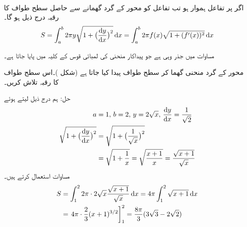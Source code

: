 \\
اگر  پر تفاعل  ہموار ہو تب تفاعل  کو  محور کے گرد گھمانے سے حاصل سطح طواف کا رقبہ درج ذیل ہو گا۔
\begin{align}\label{مساوات_تکمل_استعمال_سطحی_رقبہ_پ}                                
S=\int_a^b2\pi y\sqrt{1+\big(\frac{\dif y}{\dif x}\big)^2}\dif x=\int_a^b2\pi f(x)\sqrt{1+(f'(x))^2}\dif x
\end{align}

مساوات  میں جذر وہی ہے جو پیداکار منحنی کی لمبائی قوس کے کلیہ میں پایا جاتا ہے۔

محور  کے گرد منحنی  گھما کر سطح طواف پیدا کیا جاتا ہے (شکل )۔اس سطح طواف کا رقبہ تلاش کریں۔

حل:\quad
ہم درج ذیل لیتے ہوئے
\begin{align*}
a&=1,\, b=2,\, y=2\sqrt{x},\, \frac{\dif y}{\dif x}=\frac{1}{\sqrt{2}}\\
\sqrt{1+\big(\frac{\dif y}{\dif x}\big)^2}&=\sqrt{1+\big(\frac{1}{\sqrt{x}}\big)^2}\\
&=\sqrt{1+\frac{1}{x}}=\sqrt{\frac{x+1}{x}}=\frac{\sqrt{x+1}}{\sqrt{x}}
\end{align*}
 مساوات  استعمال کرتے ہیں۔
\begin{align*}
S&=\int_1^22\pi \cdot2\sqrt{x}\frac{\sqrt{x+1}}{\sqrt{x}}\dif x=4\pi\int_1^2\sqrt{x+1}\dif x\\
&=\left.4\pi\cdot\frac{2}{3}(x+1)^{3/2}\right]_1^2=\frac{8\pi}{3}(3\sqrt{3}-2\sqrt{2})
\end{align*}


